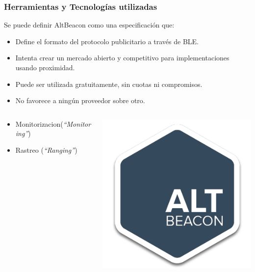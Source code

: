 \begin{frame}
	\frametitle{Herramientas y Tecnologías utilizadas}
			Se puede definir AltBeacon como una especificación que:
			\begin{itemize}
				\item {Define el formato del protocolo publicitario a través de BLE.}
				\item {Intenta crear un mercado abierto y competitivo para implementaciones usando proximidad.}
				\item {Puede ser utilizada gratuitamente, sin cuotas ni compromisos.}
				\item {No favorece a ningún proveedor sobre otro.}
			\end{itemize}
		\endblock{}
			\begin{columns}
				\begin{column}{0.7\textwidth}
					\begin{itemize}
						\item {Monitorizacion(\textit{``Monitoring''})}
						\item {Rastreo (\textit{``Ranging''})}
					\end{itemize}
				\end{column}
				\begin{column}{0.3\textwidth}
					\vfill 
					\begin{center}
						\includegraphics[width=0.5\linewidth]{Images/logos/altBeacon}
					\end{center}
				\end{column}
			\end{columns}
		\endblock{}
\end{frame}

